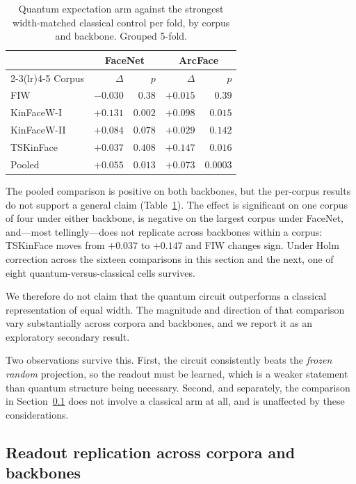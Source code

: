 \documentclass[preprint,12pt]{elsarticle}
\begin{document}
\begin{table}[t]
\centering
\caption{Quantum expectation arm against the strongest width-matched classical
control per fold, by corpus and backbone. Grouped 5-fold.}
\label{tab:widthctl}
\begin{tabular}{lrrrr}
\toprule
& \multicolumn{2}{c}{FaceNet} & \multicolumn{2}{c}{ArcFace} \\
\cmidrule(lr){2-3}\cmidrule(lr){4-5}
Corpus & $\Delta$ & $p$ & $\Delta$ & $p$ \\
\midrule
FIW          & $-0.030$ & $0.38$ & $+0.015$ & $0.39$ \\
KinFaceW-I   & $+0.131$ & $0.002$ & $+0.098$ & $0.015$ \\
KinFaceW-II  & $+0.084$ & $0.078$ & $+0.029$ & $0.142$ \\
TSKinFace    & $+0.037$ & $0.408$ & $+0.147$ & $0.016$ \\
\midrule
Pooled       & $+0.055$ & $0.013$ & $+0.073$ & $0.0003$ \\
\bottomrule
\end{tabular}
\end{table}

The pooled comparison is positive on both backbones, but the per-corpus results
do not support a general claim (Table~\ref{tab:widthctl}). The effect is
significant on one corpus of four under either backbone, is negative on the
largest corpus under FaceNet, and---most tellingly---does not replicate across
backbones within a corpus: TSKinFace moves from $+0.037$ to $+0.147$ and FIW
changes sign. Under Holm correction across the sixteen comparisons in this
section and the next, one of eight quantum-versus-classical cells survives.

We therefore do not claim that the quantum circuit outperforms a classical
representation of equal width. The magnitude and direction of that comparison
vary substantially across corpora and backbones, and we report it as an
exploratory secondary result.

Two observations survive this. First, the circuit consistently beats the
\emph{frozen random} projection, so the readout must be learned, which is a
weaker statement than quantum structure being necessary. Second, and separately,
the comparison in Section~\ref{sec:readout-replication} does not involve a
classical arm at all, and is unaffected by these considerations.

\subsection{Readout replication across corpora and backbones}
\label{sec:readout-replication}
\end{document}

